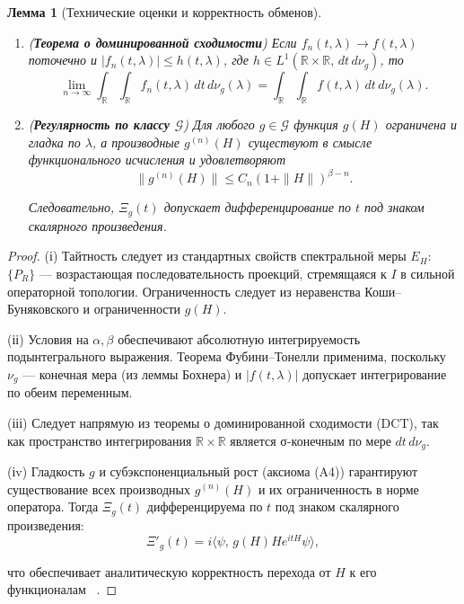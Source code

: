 \documentclass{article}
\numberwithin{equation}{section}
\theoremstyle{plain}
\newtheorem{lemma}{Лемма}
\theoremstyle{definition}
\theoremstyle{remark}
\def\alpha{α}\def\beta{β}\def\gamma{γ}\def\Gamma{Γ}%
\def\infty{∞}\def\partial{∂}\def\sum{Σ}\def\int{∫}%
\begin{document}
\begin{lemma}[Технические оценки и корректность обменов]
\begin{enumerate}[label=(\roman*), leftmargin=2.3em]
  по теореме Фубини–Тонелли ~\cite{SteinShakarchi2005}.

  \item (\textbf{Теорема о доминированной сходимости})  
  Если $f_n(t,\lambda)\to f(t,\lambda)$ поточечно и 
  $|f_n(t,\lambda)|\le h(t,\lambda)$, где 
  $h\in L^1(\mathbb R\times\mathbb R,\,dt\,d\nu_g)$,
  то
\begin{equation}
  \lim_{n\to\infty}
  \int_{\mathbb R}\!\!\int_{\mathbb R}
  f_n(t,\lambda)\,dt\,d\nu_g(\lambda)
  =
  \int_{\mathbb R}\!\!\int_{\mathbb R}
  f(t,\lambda)\,dt\,d\nu_g(\lambda).
\label{eq:QSSC0020}
\end{equation}


  \item (\textbf{Регулярность по классу $\mathcal G$})  
  Для любого $g\in\mathcal G$ функция $g(H)$ ограничена и гладка по $\lambda$, а производные $g^{(n)}(H)$ существуют в смысле функционального исчисления и удовлетворяют
\begin{equation}
  \|g^{(n)}(H)\|\le C_n(1+\|H\|)^{\beta-n}.
\label{eq:QSSC0021}
\end{equation}

  Следовательно, $\Xi_g(t)$ допускает дифференцирование по $t$ под знаком скалярного произведения.
\end{enumerate}
\end{lemma}

\begin{proof}
(і) Тайтность следует из стандартных свойств спектральной меры $E_H$: $\{P_R\}$ — возрастающая последовательность проекций, стремящаяся к $I$ в сильной операторной топологии. Ограниченность следует из неравенства Коши–Буняковского и ограниченности $g(H)$.

(іі) Условия на $\alpha,\beta$ обеспечивают абсолютную интегрируемость подынтегрального выражения. Теорема Фубини–Тонелли применима, поскольку $\nu_g$ — конечная мера (из леммы Бохнера) и $|f(t,\lambda)|$ допускает интегрирование по обеим переменным.

(ііі) Следует напрямую из теоремы о доминированной сходимости (DCT), так как пространство интегрирования $\mathbb R\times\mathbb R$ является σ-конечным по мере $dt\,d\nu_g$.

(іv) Гладкость $g$ и субэкспоненциальный рост (аксиома (A4)) гарантируют существование всех производных $g^{(n)}(H)$ и их ограниченность в норме оператора. Тогда $\Xi_g(t)$ дифференцируема по $t$ под знаком скалярного произведения:
\begin{equation}
\Xi'_g(t)=i\langle\psi,\,g(H)He^{itH}\psi\rangle,
\label{eq:QSSC0022}
\end{equation}

что обеспечивает аналитическую корректность перехода от $H$ к его функционалам ~\cite{Davies1995}.
\end{proof}
\end{document}
